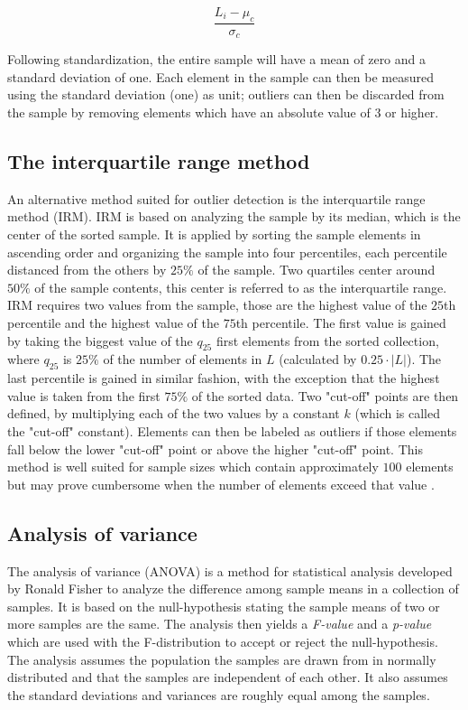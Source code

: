 \begin{equation}
\label{eqn:zscore}
 \frac{L_i - \mu_c} {\sigma_c}
\end{equation}

Following standardization, the entire sample will have a mean of zero and a standard deviation of one. Each element in the sample can then be measured using the standard deviation (one) as unit; outliers can then be discarded from the sample by removing elements which have an absolute value of 3 or higher.


\subsection{The interquartile range method}
An alternative method suited for outlier detection is the interquartile range method (IRM). IRM is based on analyzing the sample by its median, which is the center of the sorted sample. It is applied by sorting the sample elements in ascending order and organizing the sample into four percentiles, each percentile distanced from the others by $25\%$ of the sample.  Two quartiles center around $50\%$ of the sample contents, this center is referred to as the interquartile range. IRM requires two values from the sample, those are the highest value of the $25$th percentile and the highest value of the $75$th percentile. The first value is gained by taking the biggest value of the $q_{25}$ first elements from the sorted collection, where $q_{25}$ is $25\%$ of the number of elements in $L$ (calculated by $0.25 \cdot |L|$). The last percentile is gained in similar fashion, with the exception that the highest value is taken from the first $75\%$ of the sorted data. Two "cut-off" points are then defined, by multiplying each of the two values by a constant $k$ (which is called the "cut-off" constant). Elements can then be labeled as outliers if those elements fall below the lower "cut-off" point or above the higher "cut-off" point. This method is well suited for sample sizes which contain approximately $100$ elements but may prove cumbersome when the number of elements exceed that value \cite{vinutha2018detection, walfish2006review, dovoedo2015boxplot}.


\subsection{Analysis of variance}

The analysis of variance (ANOVA) is a method for statistical analysis developed by Ronald Fisher to analyze the difference among sample means in a collection of samples. It is based on the null-hypothesis stating the sample means of two or more samples are the same. The analysis then yields a \textit{F-value} and a \textit{p-value} which are used with the F-distribution to accept or reject the null-hypothesis. The analysis assumes the population the samples are drawn from in normally distributed and that the samples are independent of each other. It also assumes the standard deviations and variances are roughly equal among the samples.

